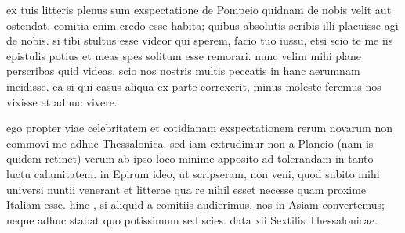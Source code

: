 


 ex tuis litteris plenus sum exspectatione de Pompeio quidnam de nobis velit aut ostendat. comitia enim credo esse habita; quibus absolutis scribis illi placuisse agi de nobis. si tibi stultus esse videor qui sperem, facio tuo iussu, etsi scio te me iis epistulis potius et meas spes solitum esse remorari. nunc velim mihi plane perscribas quid videas. scio nos nostris multis peccatis in hanc aerumnam incidisse. ea si qui casus aliqua ex parte correxerit, minus moleste feremus nos vixisse et adhuc vivere.

 ego propter viae celebritatem et cotidianam exspectationem rerum novarum non commovi me adhuc Thessalonica. sed iam extrudimur non a Plancio (nam is quidem retinet) verum ab ipso loco minime apposito ad tolerandam in tanto luctu calamitatem. in Epirum ideo, ut scripseram, non veni, quod subito mihi universi nuntii venerant et litterae qua re nihil esset necesse quam proxime Italiam esse. hinc , si aliquid a comitiis audierimus, nos in Asiam convertemus; neque adhuc stabat quo potissimum sed scies. data xii Sextilis Thessalonicae.
